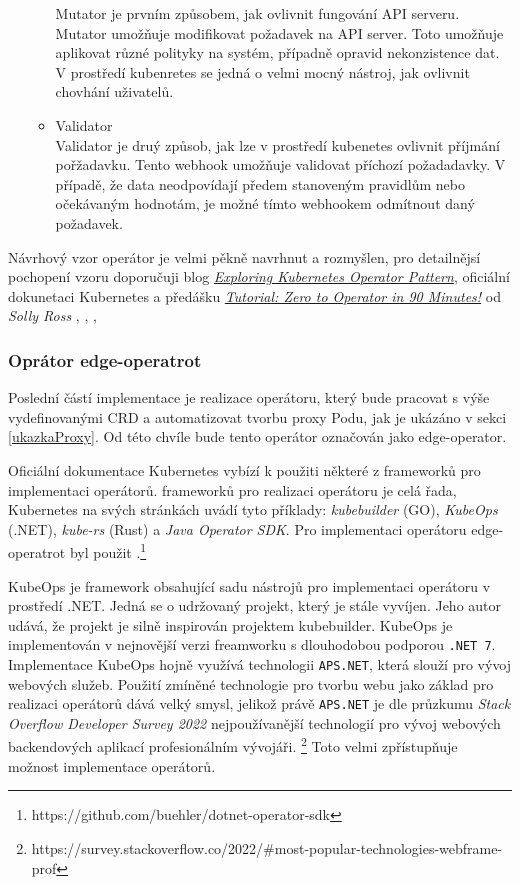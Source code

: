 \begin{itemize}
\begin{itemize}
        Mutator je prvním způsobem, jak ovlivnit fungování API serveru. Mutator umožňuje modifikovat požadavek na API server. Toto umožňuje aplikovat různé polityky na systém, případně opravid nekonzistence dat. V prostředí kubenretes se jedná o velmi mocný nástroj, jak ovlivnit chovhání uživatelů.  
        \item Validator\\
        Validator je druý způsob, jak lze v prostředí kubenetes ovlivnit příjmání pořžadavku. Tento webhook umožňuje validovat příchozí požadadavky. V případě, že data neodpovídají předem stanoveným pravidlům nebo očekávaným hodnotám, je možné tímto webhookem odmítnout daný požadavek.
    \end{itemize}
\end{itemize}
Návrhový vzor operátor je velmi pěkně navrhnut a rozmyšlen, pro detailnějsí pochopení vzoru doporučuji blog \href{https://iximiuz.com/en/posts/kubernetes-operator-pattern/}{\textit{Exploring Kubernetes Operator Pattern}}, oficiální dokunetaci Kubernetes a předášku \href{https://youtu.be/KBTXBUVNF2I}{\textit{Tutorial: Zero to Operator in 90 Minutes!}} od \textit{Solly Ross}
 \cite{bhler_2021_kubeops},
 \cite{kaplan_2022_argocd},
 \cite{velichko_2021_exploring},
 \cite{cncfcloudnativecomputingfoundation_2020_tutorial}

\subsubsection{Oprátor edge-operatrot}
Poslední částí implementace je realizace operátoru, který bude pracovat s výše vydefinovanými CRD a automatizovat tvorbu proxy Podu, jak je ukázáno v sekci \ref{ukazkaProxy}. Od této chvíle bude tento operátor označován jako edge-operator.

Oficiální dokumentace Kubernetes vybízí k použiti některé z frameworků pro implementaci operátorů. frameworků pro realizaci operátoru je celá řada, Kubernetes na svých stránkách uvádí tyto příklady: \textit{kubebuilder} (GO), \textit{KubeOps} (.NET), \textit{kube-rs} (Rust) a \textit{Java Operator SDK}. Pro implementaci operátoru edge-operatrot byl použit .\footnote{https://github.com/buehler/dotnet-operator-sdk}

KubeOps je framework obsahující sadu nástrojů pro implementaci operátoru v prostředí .NET. Jedná se o udržovaný projekt, který je stále vyvíjen. Jeho autor udává, že projekt je silně inspirován projektem kubebuilder. KubeOps je implementován v nejnovější verzi freamworku s dlouhodobou podporou \verb|.NET 7|. Implementace KubeOps hojně využívá technologii \verb|APS.NET|, která slouží pro vývoj webových služeb. Použití zmíněné technologie pro tvorbu webu jako základ pro realizaci operátorů dává velký smysl, jelikož právě \verb|APS.NET| je dle průzkumu \textit{Stack Overflow Developer Survey 2022} nejpoužívanější technologií pro vývoj webových backendových aplikací profesionálním vývojáři. \footnote{https://survey.stackoverflow.co/2022/\#most-popular-technologies-webframe-prof} Toto velmi zpřístupňuje možnost implementace operátorů.

